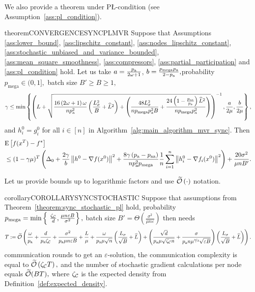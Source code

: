 \documentclass{article}
\newcommand{\algorithmname}{DASHA-PP}
\newcommand*{\probavailable}{\ensuremath{p_{\textnormal{a}}}}
\newcommand*{\probpairaa}{\ensuremath{p_{\textnormal{aa}}}}
\newcommand*{\probmega}{\ensuremath{p_{\text{mega}}}}
\begin{document}
  We also provide a theorem under P\L-condition (see Assumption~\ref{ass:pl_condition}).

  \begin{restatable}{theorem}{CONVERGENCESYNCPLMVR}
    \label{theorem:sync_stochastic_pl}
    Suppose that Assumptions \ref{ass:lower_bound}, \ref{ass:lipschitz_constant}, \ref{ass:nodes_lipschitz_constant}, \ref{ass:stochastic_unbiased_and_variance_bounded}, \ref{ass:mean_square_smoothness}, \ref{ass:compressors}, \ref{ass:partial_participation} and \ref{ass:pl_condition} hold. Let us take $a = \frac{\probavailable}{2\omega + 1}$, $b = \frac{\probmega \probavailable}{2 - \probavailable},$probability $\probmega \in (0, 1],$ batch size $B' \geq B \geq 1,$ $$\gamma \leq \min\left\{\left(L + \sqrt{\frac{16 \left(2 \omega + 1\right)\omega}{n \probavailable^2}\left(\frac{L_{\sigma}^2}{B} + \widehat{L}^2\right) + \left(\frac{48 L_{\sigma}^2}{n \probmega \probavailable^2 B} + \frac{24 \left(1 - \frac{\probpairaa}{\probavailable}\right) \widehat{L}^2}{n \probmega \probavailable^2}\right)}\right)^{-1}, \frac{a}{2\mu} , \frac{b}{2\mu}\right\},$$ and $h^{0}_i = g^{0}_i$ for all $i \in [n]$
    in Algorithm~\ref{alg:main_algorithm_mvr_sync}. Then 
    \begin{align*}
      &\Exp{f(x^{T}) - f^*} \\
      &\leq (1 - \gamma \mu)^{T}\left(\Delta_0 + \frac{2 \gamma}{b} \norm{h^{0} - \nabla f(x^{0})}^2 + \frac{8 \gamma \left(\probavailable - \probpairaa\right)}{n \probavailable^2 \probmega}\frac{1}{n}\sum_{i=1}^n\norm{h^{0}_i - \nabla f_i(x^{0})}^2\right) + \frac{20 \sigma^2}{\mu n B'}.
    \end{align*}
  \end{restatable}

  Let us provide bounds up to logarithmic factors and use $\widetilde{\mathcal{O}}\left(\cdot\right)$ notation.

  \begin{restatable}{corollary}{COROLLARYSYNCSTOCHASTIC}
    \label{cor:sync_stochastic}
    Suppose that assumptions from Theorem~\ref{theorem:sync_stochastic_pl} hold, probability $\probmega = \min \left\{\ \frac{\zeta_{\cC}}{d}, \frac{\mu n \varepsilon B}{\sigma^2}\right\},$ batch size 
    $B' = \Theta\left(\frac{\sigma^2}{\mu n \varepsilon}\right)$ 
    then \algname{\algorithmname-SYNC-MVR}
    needs
    $$T \eqdef \widetilde{\cO}\left(\frac{\omega}{\probavailable} + \frac{d}{\probavailable\zeta_{\cC}} + \frac{\sigma^2}{\probavailable \mu n \varepsilon B} + \frac{L}{\mu} + \frac{\omega}{\probavailable \mu \sqrt{n}} \left(\frac{L_{\sigma}}{\sqrt{B}} + \widehat{L}\right) + \left(\frac{\sqrt{d}}{\probavailable \mu \sqrt{\zeta_{\cC} n}} + \frac{\sigma}{\probavailable n \mu^{\nicefrac{3}{2}} \sqrt{\varepsilon B}}\right)\left(\frac{L_{\sigma}}{\sqrt{B}} + \widehat{L}\right) \right).$$
    communication rounds to get an $\varepsilon$-solution, the communication complexity is equal to $\widetilde{\mathcal{O}}\left(\zeta_{\mathcal{C}} T\right),$ and the number of stochastic gradient calculations per node equals $\widetilde{\mathcal{O}}(BT),$ where $\zeta_{\mathcal{C}}$ is the expected density from Definition~\ref{def:expected_density}.
  \end{restatable}
\end{document}
